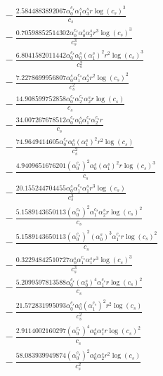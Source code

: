 \documentclass[10pt]{article}
\begin{document}
\begin{align*}
&{}  - \frac{2.5844883892067 \alpha_{0}^{c_s} \alpha_{1}^s \alpha_{3}^s r \log{\left(c_{s} \right)}^{3}}{c_{s}} \\
&{}  - \frac{0.70598852514302 \alpha_{0}^{c_s} \alpha_{0}^s \alpha_{2}^s r^{3} \log{\left(c_{s} \right)}^{3}}{c_{s}^{3}} \\
&{}  - \frac{6.8041582011442 \alpha_{0}^{c_s} \alpha_{0}^s \left(\alpha_{1}^s\right)^{2} r^{2} \log{\left(c_{s} \right)}^{3}}{c_{s}^{2}} \\
&{}  - \frac{7.2278699956807 \alpha_{0}^s \alpha_{1}^{c_s} \alpha_{2}^s r^{2} \log{\left(c_{s} \right)}^{2}}{c_{s}^{2}} \\
&{}  - \frac{14.908599752858 \alpha_{0}^{c_s} \alpha_{2}^{c_s} \alpha_{2}^s r \log{\left(c_{s} \right)}}{c_{s}} \\
&{}  - \frac{34.007267678512 \alpha_{0}^{c_s} \alpha_{0}^s \alpha_{1}^{c_s} \alpha_{2}^{c_s} r}{c_{s}} \\
&{}  - \frac{74.9649414605 \alpha_{0}^{c_s} \alpha_{0}^s \left(\alpha_{1}^s\right)^{2} r^{2} \log{\left(c_{s} \right)}}{c_{s}^{2}} \\
&{}  - \frac{4.9409651676201 \left(\alpha_{0}^{c_s}\right)^{2} \alpha_{0}^s \left(\alpha_{1}^s\right)^{2} r \log{\left(c_{s} \right)}^{3}}{c_{s}} \\
&{}  - \frac{20.155244704455 \alpha_{0}^s \alpha_{1}^{c_s} \alpha_{1}^s r^{3} \log{\left(c_{s} \right)}}{c_{s}^{3}} \\
&{}  - \frac{5.1589143650113 \left(\alpha_{0}^{c_s}\right)^{2} \alpha_{1}^{c_s} \alpha_{2}^s r \log{\left(c_{s} \right)}^{2}}{c_{s}} \\
&{}  - \frac{5.1589143650113 \left(\alpha_{0}^{c_s}\right)^{2} \left(\alpha_{0}^s\right)^{3} \alpha_{1}^{c_s} r \log{\left(c_{s} \right)}^{2}}{c_{s}} \\
&{}  - \frac{0.32294842510727 \alpha_{0}^s \alpha_{1}^{c_s} \alpha_{1}^s r^{3} \log{\left(c_{s} \right)}^{3}}{c_{s}^{3}} \\
&{}  - \frac{5.2099597813588 \alpha_{0}^{c_s} \left(\alpha_{0}^s\right)^{4} \alpha_{1}^{c_s} r \log{\left(c_{s} \right)}^{2}}{c_{s}} \\
&{}  - \frac{21.572831995093 \alpha_{0}^{c_s} \alpha_{0}^s \left(\alpha_{1}^{c_s}\right)^{2} r^{2} \log{\left(c_{s} \right)}}{c_{s}^{2}} \\
&{}  - \frac{2.9114002160297 \left(\alpha_{0}^{c_s}\right)^{4} \alpha_{0}^s \alpha_{1}^s r \log{\left(c_{s} \right)}^{2}}{c_{s}} \\
&{}  - \frac{58.083939949874 \left(\alpha_{0}^{c_s}\right)^{2} \alpha_{0}^s \alpha_{2}^s r^{2} \log{\left(c_{s} \right)}}{c_{s}^{2}} \\

\end{align*}
\end{document}
